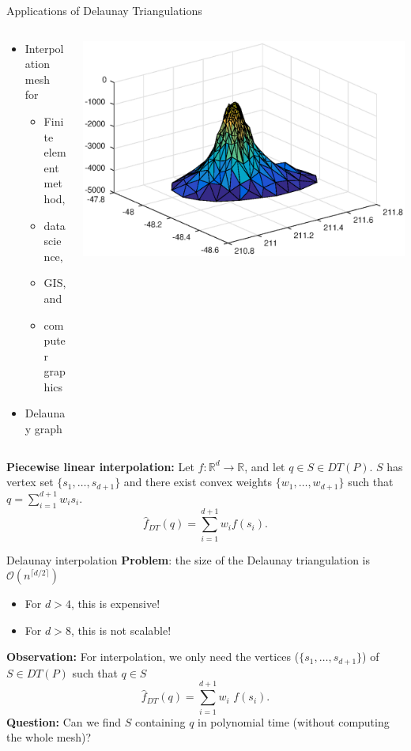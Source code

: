 \documentclass[xcolor=dvipsnames]{beamer}
\begin{document}
\begin{frame}{Applications of Delaunay Triangulations}
\begin{columns}
\begin{column}{.48\textwidth}
\begin{itemize}
\item Interpolation mesh for
\begin{itemize}
\item Finite element method,
\item data science,
\item GIS, and
\item computer graphics
\end{itemize}
\item Delaunay graph
\end{itemize}
\end{column}
\begin{column}{.48\textwidth}
\hbox{\includegraphics[width=.9\textwidth]{seamount.eps}}
\end{column}
\end{columns}
\bigskip
\pause
{\bf Piecewise linear interpolation:}
Let $f : \mathbb{R}^d \rightarrow \mathbb{R}$, and let $q \in S \in DT(P)$.
$S$ has vertex set $\{s_1, \ldots, s_{d+1}\}$ and there exist convex weights
$\{w_1, \ldots, w_{d+1}\}$ such that $q = \sum_{i=1}^{d+1} w_i s_i$.
$$
{\hat f}_{DT}(q) = \sum_{i=1}^{d+1} w_i f(s_i).
$$
\end{frame}
\begin{frame}{Delaunay interpolation}
\textbf{Problem}: the size of the Delaunay triangulation is
$\mathcal{O}\left(n^{\lceil d/2 \rceil}\right)$
\begin{itemize}
\item For $d > 4$, this is expensive!
\item For $d > 8$, this is not scalable!
\end{itemize}
\medskip
\textbf{Observation:}
For interpolation, we only need the
vertices ($\{s_1, \ldots, s_{d+1}\}$) of $S \in DT(P)$ such that $q\in S$
$$
{\hat f}_{DT}(q) = \sum_{i=1}^{d+1} w_i\text{~}f(s_i).
$$
\medskip
\textbf{Question:}
Can we find $S$ containing $q$ in polynomial time (without computing the whole mesh)?
\end{frame}
\end{document}
